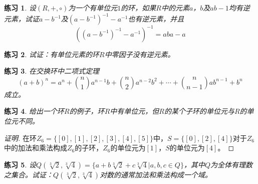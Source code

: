 \documentclass{article}
\newtheorem{Exercise}{练习}
\begin{document}
\begin{CJK*}{UTF8}{gbsn}
\begin{Exercise}
  设$(R,+,\circ)$为一个有单位元$1$的环，如果$R$中的元素$a$，$b$及$ab-1$均有逆元素，试证$a-b^{-1}$及$(a-b^{-1})^{-1}-a^{-1}$也有逆元素，并且
\[((a-b^{-1})^{-1}-a^{-1})^{-1}=aba-a\]
\end{Exercise}

\begin{Exercise}
  试证：有单位元素的环$R$中零因子没有逆元素。
\end{Exercise}

\begin{Exercise}
  在交换环中二项式定理
\[(a+b)^n=a^n+\binom{n}{1}a^{n-1}b+\binom{n}{2}a^{n-2}b^2+\cdots+\binom{n}{n-1}ab^{n-1}+b^n\]
  成立。
\end{Exercise}


\begin{Exercise}
  给出一个环$R$的例子，环$R$中有单位元，但$R$的某个子环的单位元与$R$的单位元不同。
\end{Exercise}
\begin{proof}[证明]
  在环$Z_6=\{[0],[1],[2],[3],[4],[5]\}$中，$S=\{[0],[2],[4]\}$对于$Z_6$中的加法和乘法构成$Z_6$的子环，$Z_6$的单位元为$[1]$，$S$的单位元为$[4]$。
\end{proof}


\begin{Exercise}
  设$Q(\sqrt[3]{2},\sqrt[3]{4})=\{a+b\sqrt[3]{2}+c\sqrt[3]{4}|a,b,c\in Q\}$，其中$Q$为全体有理数之集合。试证：$Q(\sqrt[3]{2},\sqrt[3]{4})$对数的通常加法和乘法构成一个域。  
\end{Exercise}


\end{CJK*}
\end{document}
